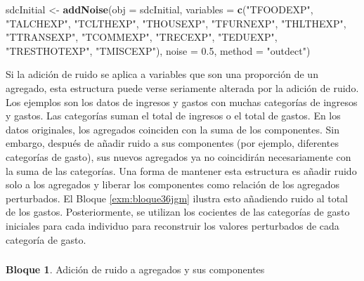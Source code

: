 \documentclass[]{book}
\newenvironment{Shaded}{\begin{snugshade}}{\end{snugshade}}
\newcommand{\DataTypeTok}[1]{\textcolor[rgb]{0.13,0.29,0.53}{#1}}
\newcommand{\FloatTok}[1]{\textcolor[rgb]{0.00,0.00,0.81}{#1}}
\newcommand{\KeywordTok}[1]{\textcolor[rgb]{0.13,0.29,0.53}{\textbf{#1}}}
\newcommand{\NormalTok}[1]{#1}
\newcommand{\StringTok}[1]{\textcolor[rgb]{0.31,0.60,0.02}{#1}}
\theoremstyle{definition}
\theoremstyle{definition}
\newtheorem{example}{Bloque}[chapter]
\theoremstyle{definition}
\theoremstyle{definition}
\theoremstyle{remark}
\begin{document}
\begin{Shaded}
\begin{Highlighting}[]
\NormalTok{sdcInitial <-}\StringTok{ }\KeywordTok{addNoise}\NormalTok{(}\DataTypeTok{obj =}\NormalTok{ sdcInitial, }\DataTypeTok{variables =} \KeywordTok{c}\NormalTok{(}\StringTok{"TFOODEXP"}\NormalTok{, }\StringTok{"TALCHEXP"}\NormalTok{, }\StringTok{"TCLTHEXP"}\NormalTok{, }\StringTok{"THOUSEXP"}\NormalTok{, }
                                                       \StringTok{"TFURNEXP"}\NormalTok{, }\StringTok{"THLTHEXP"}\NormalTok{, }\StringTok{"TTRANSEXP"}\NormalTok{, }\StringTok{"TCOMMEXP"}\NormalTok{, }
                                                       \StringTok{"TRECEXP"}\NormalTok{, }\StringTok{"TEDUEXP"}\NormalTok{, }\StringTok{"TRESTHOTEXP"}\NormalTok{, }\StringTok{"TMISCEXP"}\NormalTok{), }
                       \DataTypeTok{noise =} \FloatTok{0.5}\NormalTok{, }\DataTypeTok{method =} \StringTok{"outdect"}\NormalTok{)}
\end{Highlighting}
\end{Shaded}

Si la adición de ruido se aplica a variables que son una proporción de un agregado, esta estructura puede verse seriamente alterada por la adición de ruido. Los ejemplos son los datos de ingresos y gastos con muchas categorías de ingresos y gastos. Las categorías suman el total de ingresos o el total de gastos. En los datos originales, los agregados coinciden con la suma de los componentes. Sin embargo, después de añadir ruido a sus componentes (por ejemplo, diferentes categorías de gasto), sus nuevos agregados ya no coincidirán necesariamente con la suma de las categorías. Una forma de mantener esta estructura es añadir ruido solo a los agregados y liberar los componentes como relación de los agregados perturbados. El Bloque \ref{exm:bloque36jgm} ilustra esto añadiendo ruido al total de los gastos. Posteriormente, se utilizan los cocientes de las categorías de gasto iniciales para cada individuo para reconstruir los valores perturbados de cada categoría de gasto.

\hypertarget{section-10}{%
\subsubsection{}\label{section-10}}

\begin{example}
\protect\hypertarget{exm:bloque36jgm}{}{\label{exm:bloque36jgm} }Adición de ruido a agregados y sus componentes
\end{example}
\end{document}
